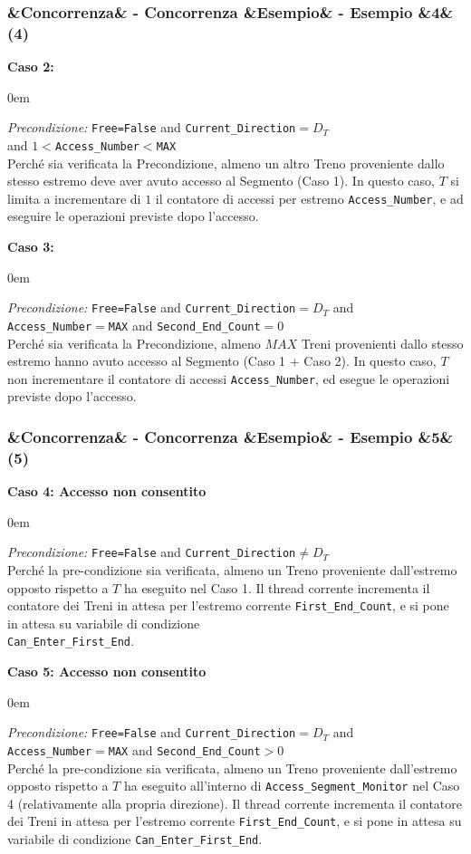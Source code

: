 \documentclass[slidestop,compress,blackandwhite]{beamer}
\newcommand{\ttt}[1]{\texttt{#1}}
\newcommand{\ii}[1]{\textit{#1}}
\newcommand{\describe}[2]{
	\textbf{#1}\\
	\begin{addmargin}[2em]{0em}
		#2
	\end{addmargin}
}
\newcommand{\newtitle}[4]{
	#1 
	\ifx&#2&%
	\else
  		\large- #2
	\fi
	\ifx&#3&%
	\else
  		\normalsize- #3
	\fi
	\ifx&#4&%
	\else
  		\normalsize (#4)
	\fi
}
\newcommand{\newframe}[5]{
	\begin{frame}
		\frametitle{\newtitle{#1}{#2}{#3}{#4}}
		#5
	\end{frame}
}
\begin{document}
	
	\newframe{}{Concorrenza}{Esempio}{4}{
		\describe{\footnotesize Caso 2:}{
			\footnotesize
			\justifying
			\ii{Precondizione:} \ttt{Free=False} and \ttt{Current\_Direction}$= D_T$ \\and $1<$\ttt{Access\_Number}$<$\ttt{MAX} \\
			Perché sia verificata la Precondizione, almeno un altro Treno proveniente dallo stesso estremo deve aver avuto accesso al Segmento (Caso 1). In questo caso, $T$ si limita a incrementare di $1$ il contatore di accessi per estremo \ttt{Access\_Number}, e ad eseguire le operazioni previste dopo l'accesso.
		}
		\describe{\footnotesize Caso 3:}{
			\footnotesize
			\justifying
			\ii{Precondizione:} \ttt{Free=False} and \ttt{Current\_Direction}$= D_T$ and \\\ttt{Access\_Number}$=$\ttt{MAX} and \ttt{Second\_End\_Count}$=0$ \\
			Perché sia verificata la Precondizione, almeno $MAX$ Treni provenienti dallo stesso estremo hanno avuto accesso al Segmento (Caso 1 + Caso 2). In questo caso, $T$ non incrementare il contatore di accessi \ttt{Access\_Number}, ed esegue le operazioni previste dopo l'accesso.
		}
	}
	
	
	\newframe{}{Concorrenza}{Esempio}{5}{
		
		\describe{\footnotesize Caso 4: Accesso non consentito}{
			\footnotesize
			\justifying
			\ii{Precondizione:} \ttt{Free=False} and \ttt{Current\_Direction}$\ne D_T$\\
			Perché la pre-condizione sia verificata, almeno un Treno proveniente dall'estremo opposto rispetto a $T$ ha eseguito nel Caso 1. Il thread corrente incrementa il contatore dei Treni in attesa per l'estremo corrente \ttt{First\_End\_Count}, e si pone in attesa su variabile di condizione \\\ttt{Can\_Enter\_First\_End}. 
			
		}
		\describe{\footnotesize Caso 5: Accesso non consentito}{
			\footnotesize
			\justifying
			\ii{Precondizione:} \ttt{Free=False} and \ttt{Current\_Direction}$= D_T$ and \\\ttt{Access\_Number}$=$\ttt{MAX} and \ttt{Second\_End\_Count}$>0$\\
			Perché la pre-condizione sia verificata, almeno un Treno proveniente dall'estremo opposto rispetto a $T$ ha eseguito all'interno di \ttt{Access\_Segment\_Monitor} nel Caso 4 (relativamente alla propria direzione). Il thread corrente incrementa il contatore dei Treni in attesa per l'estremo corrente \ttt{First\_End\_Count}, e si pone in attesa su variabile di condizione \ttt{Can\_Enter\_First\_End}. 
			
		}
	}
	
\end{document}
